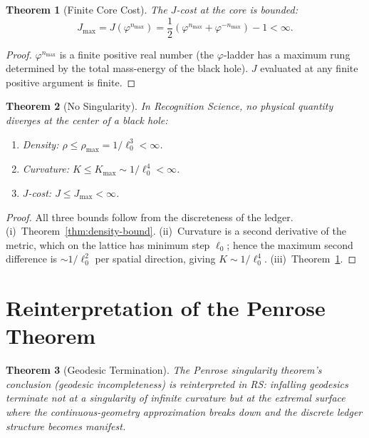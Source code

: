 \documentclass[12pt,a4paper]{article}
\newtheorem{theorem}{Theorem}[section]
\theoremstyle{definition}
\theoremstyle{remark}
\begin{document}
\begin{theorem}[Finite Core Cost]
\label{thm:finite-cost}
The $J$-cost at the core is bounded:
\begin{equation}
  J_{\max} = J(\varphi^{n_{\max}})
  = \frac{1}{2}\left(\varphi^{n_{\max}} + \varphi^{-n_{\max}}\right)
  - 1 < \infty.
\end{equation}
\end{theorem}

\begin{proof}
$\varphi^{n_{\max}}$ is a finite positive real number (the
$\varphi$-ladder has a maximum rung determined by the total mass-energy
of the black hole).  $J$ evaluated at any finite positive argument is
finite.
\end{proof}

\begin{theorem}[No Singularity]
\label{thm:no-singularity}
In Recognition Science, no physical quantity diverges at the center
of a black hole:
\begin{enumerate}[label=(\roman*)]
  \item Density: $\rho \leq \rho_{\max} = 1/\ell_0^3 < \infty$.
  \item Curvature: $K \leq K_{\max} \sim 1/\ell_0^4 < \infty$.
  \item $J$-cost: $J \leq J_{\max} < \infty$.
\end{enumerate}
\end{theorem}

\begin{proof}
All three bounds follow from the discreteness of the ledger.
(i)~Theorem~\ref{thm:density-bound}.
(ii)~Curvature is a second derivative of the metric, which on the
lattice has minimum step $\ell_0$; hence the maximum second difference
is $\sim 1/\ell_0^2$ per spatial direction, giving $K \sim 1/\ell_0^4$.
(iii)~Theorem~\ref{thm:finite-cost}.
\end{proof}

\section{Reinterpretation of the Penrose Theorem}
\label{sec:penrose}

\begin{theorem}[Geodesic Termination]
\label{thm:geodesic}
The Penrose singularity theorem's conclusion (geodesic incompleteness)
is reinterpreted in RS: infalling geodesics terminate not at a
singularity of infinite curvature but at the \emph{extremal surface}
where the continuous-geometry approximation breaks down and the
discrete ledger structure becomes manifest.
\end{theorem}
\end{document}
